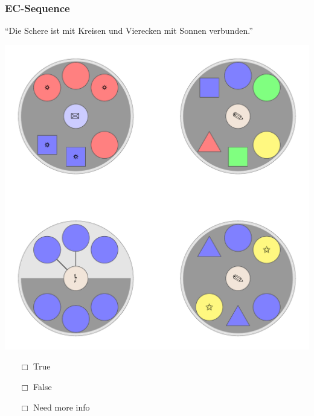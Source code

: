\documentclass[fleqn,10pt,serif,xcolor=dvipsnames]{beamer}
\newcommand{\EC}{EC}
\newcommand{\mymark}[1]{{\color{blue}{#1}}}
\begin{document}
\begin{frame}
  \frametitle{\EC-Sequence}
  \begin{center}
    ``Die Schere ist mit Kreisen und Vierecken mit Sonnen verbunden.''

    \vspace{0.1cm}

    \includegraphics[width=0.5 \textwidth]{../../pictures/ec_01_2.pdf}

    \vspace{0.1cm}

    \begin{multicols}{3}
      \begin{itemize} 
      \item[$\Box$] True\\
        \onslide<2>{$\leadsto$  \mymark{false}}
      \item[$\Box$] False\\
        \onslide<2>{$\leadsto$ \mymark{false}}
      \item[$\Box$] Need more info 
      \end{itemize}
    \end{multicols}

  \end{center}
\end{frame}
\end{document}

